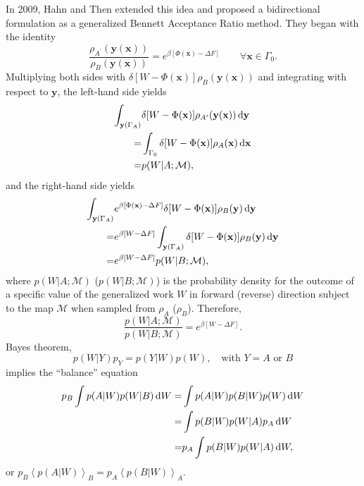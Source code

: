 In 2009, Hahn and Then extended this idea and proposed a bidirectional formulation as a generalized Bennett Acceptance Ratio method\cite{HahnPRE2009}.
They began with the identity
\begin{equation}
	\frac{\rho_{A^\prime}(\mathbf{y}(\mathbf{x}))}{\rho_B(\mathbf{y}(\mathbf{x}))}=e^{\beta\left[\Phi(\mathbf{x})-\Delta F\right]}\qquad \forall \mathbf{x}\in \Gamma_0.
\end{equation}
Multiplying both sides with $\delta [W-\Phi(\mathbf{x})]\rho_B(\mathbf{y}(\mathbf{x}))$ and integrating with respect to $\mathbf{y}$, the left-hand side yields
\begin{align}
	\int_{\mathbf{y}(\Gamma_A)}&\delta[W-\Phi(\mathbf{x})]\rho_{A^\prime}(\mathbf{y}(\mathbf{x}))\mathop{}\!\mathrm{d} \mathbf{y}\notag\\
	                          =&\int_{\Gamma_0}\delta[W-\Phi(\mathbf{x})]\rho_A(\mathbf{x})\mathop{}\!\mathrm{d} \mathbf{x}\notag\\
	                          =&p(W|A;\mathcal{M}),
\end{align}
and the right-hand side yields
\begin{align}
	\int_{\mathbf{y}(\Gamma_A)}&e^{\beta\left[\Phi(\mathbf{x})-\Delta F\right]}\delta[W-\Phi(\mathbf{x})]\rho_B(\mathbf{y})\mathop{}\!\mathrm{d} \mathbf{y}\notag\\
	                          =&e^{\beta\left[W-\Delta F\right]}\int_{\mathbf{y}(\Gamma_A)}\delta[W-\Phi(\mathbf{x})]\rho_B(\mathbf{y})\mathop{}\!\mathrm{d} \mathbf{y}\notag\\
	                          =&e^{\beta\left[W-\Delta F\right]}p(W|B;\mathcal{M}),
\end{align}
where $p(W|A;\mathcal{M})$ ($p(W|B;\mathcal{M})$) is the probability density for the outcome of a specific value of the generalized work $W$ in forward (reverse) direction subject to the map $\mathcal{M}$ when sampled from $\rho_A$ ($\rho_B$). Therefore,
\begin{equation}
	\frac{p(W|A;\mathcal{M})}{p(W|B;\mathcal{M})}=e^{\beta\left[W-\Delta F\right]}.
	\label{Eq:FEM:TP:FluctTheo}
\end{equation}
Bayes theorem,
\begin{equation}
	p(W|Y)p_Y=p(Y|W)p(W), \quad \text{with $Y=A$ or $B$}
	\label{Eq:FEM:TP:Bayes}
\end{equation}
implies the ``balance'' equation
\begin{align}
	p_B\int p(A|W)p(W|B)\mathop{}\!\mathrm{d} W=&\int p(A|W)p(B|W)p(W)\mathop{}\!\mathrm{d} W\notag\\
	                           =&\int p(B|W)p(W|A)p_A\mathop{}\!\mathrm{d} W\notag\\
	                           =&p_A\int p(B|W)p(W|A)\mathop{}\!\mathrm{d} W,
	                           \label{Eq:FEM:TP:BalEq}
\end{align}
or $p_B\left<p(A|W)\right>_B=p_A\left<p(B|W)\right>_A$.

